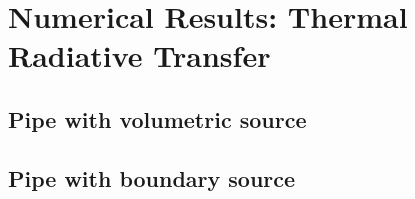 
\chapter{Numerical Results: Thermal Radiative Transfer}

\section{Pipe with volumetric source}

\section{Pipe with boundary source}


